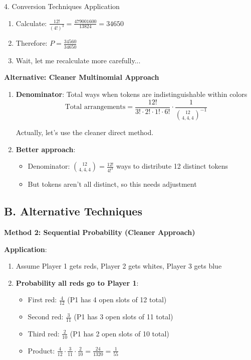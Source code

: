\documentclass[12pt]{article}
\begin{document}
\begin{conversionbox}{4. Conversion Techniques Application}
\begin{enumerate}
    \item Calculate: $\frac{12!}{(4!)^3} = \frac{479001600}{13824} = 34650$
    
    \item Therefore: $P = \frac{34560}{34650}$
    
    \item Wait, let me recalculate more carefully...
\end{enumerate}

\textbf{Alternative: Cleaner Multinomial Approach}

\begin{enumerate}
    \item \textbf{Denominator}: Total ways when tokens are indistinguishable within colors
    \[\text{Total arrangements} = \frac{12!}{3! \cdot 2! \cdot 1! \cdot 6!} \cdot \frac{1}{\binom{12}{4,4,4}^{-1}}\]
    
    Actually, let's use the cleaner direct method.
    
    \item \textbf{Better approach}: 
    \begin{itemize}
        \item Denominator: $\binom{12}{4,4,4} = \frac{12!}{4!^3}$ ways to distribute 12 distinct tokens
        \item But tokens aren't all distinct, so this needs adjustment
    \end{itemize}
\end{enumerate}

\subsection*{B. Alternative Techniques}

\textbf{Method 2: Sequential Probability (Cleaner Approach)}

\textbf{Application}:
\begin{enumerate}
    \item Assume Player 1 gets reds, Player 2 gets whites, Player 3 gets blue
    
    \item \textbf{Probability all reds go to Player 1}:
    \begin{itemize}
        \item First red: $\frac{4}{12}$ (P1 has 4 open slots of 12 total)
        \item Second red: $\frac{3}{11}$ (P1 has 3 open slots of 11 total)
        \item Third red: $\frac{2}{10}$ (P1 has 2 open slots of 10 total)
        \item Product: $\frac{4}{12} \cdot \frac{3}{11} \cdot \frac{2}{10} = \frac{24}{1320} = \frac{1}{55}$
    \end{itemize}
    

\end{enumerate}
\end{conversionbox}
\end{document}
